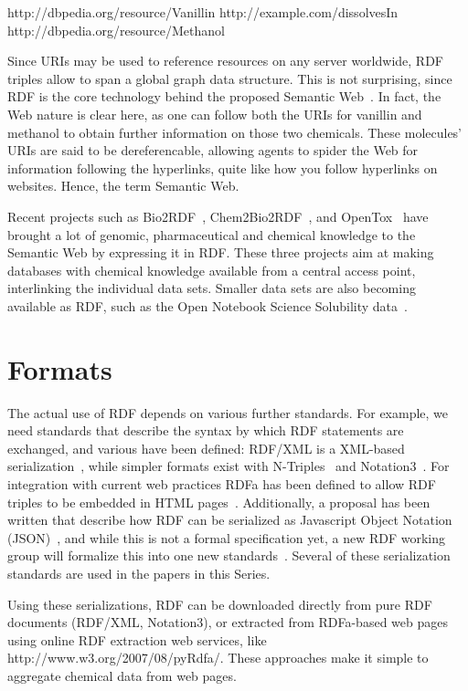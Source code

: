 \documentclass[10pt]{bmc_article}
\newenvironment{bmcformat}{\begin{raggedright}\baselineskip20pt\sloppy\setboolean{publ}{false}}{\end{raggedright}\baselineskip20pt\sloppy}
\begin{document}
\begin{bmcformat}
http://dbpedia.org/resource/Vanillin http://example.com/dissolvesIn http://dbpedia.org/resource/Methanol

Since URIs may be used to reference resources on any server worldwide, RDF triples allow to span a global graph data structure. 
This is not surprising, since RDF is the core technology behind the proposed Semantic Web~\cite{BER2001}. In fact, the Web
nature is clear here, as one can follow both the URIs for vanillin and methanol to
obtain further information on those two chemicals. These molecules' URIs are said to be
dereferencable, allowing agents to spider the Web for information following
the hyperlinks, quite like how you follow hyperlinks on websites. Hence, the term Semantic Web.

Recent projects such as Bio2RDF~\cite{BEL2008}, Chem2Bio2RDF~\cite{CHE2010},
and OpenTox~\cite{Hardy2010} have brought a lot of genomic, pharmaceutical and
chemical knowledge to the Semantic Web by expressing it in RDF.
These three projects aim at making databases with chemical knowledge
available from a central access point, interlinking the individual
data sets. Smaller data sets are also becoming available as RDF, such as
the Open Notebook Science Solubility data~\cite{citeulike:5441072}. 

\section{Formats}

The actual use of RDF depends on various further standards. For example, we need
standards that describe the syntax by which RDF statements are exchanged, and
various have been defined: RDF/XML is a XML-based serialization~\cite{Beckett2004}, while
simpler formats exist with N-Triples~\cite{Beckett2004b} and Notation3~\cite{BernersLee2006}. For integration with
current web practices RDFa has been defined to allow RDF triples to be embedded
in HTML pages~\cite{RDFA2008}. Additionally, a proposal has been written that
describe how RDF can be serialized as Javascript Object Notation (JSON)~\cite{Alexander2008}, and
while this is not a formal specification yet,
a new RDF working group will formalize this into one new standards~\cite{Herman2010}. Several
of these serialization standards are used in the papers in this Series.

Using these serializations, RDF can be downloaded directly from pure RDF
documents (RDF/XML, Notation3), or extracted from RDFa-based web pages using
online RDF extraction web services, like http://www.w3.org/2007/08/pyRdfa/.
These approaches make it simple to aggregate chemical data from web pages.


\end{bmcformat}
\end{document}
